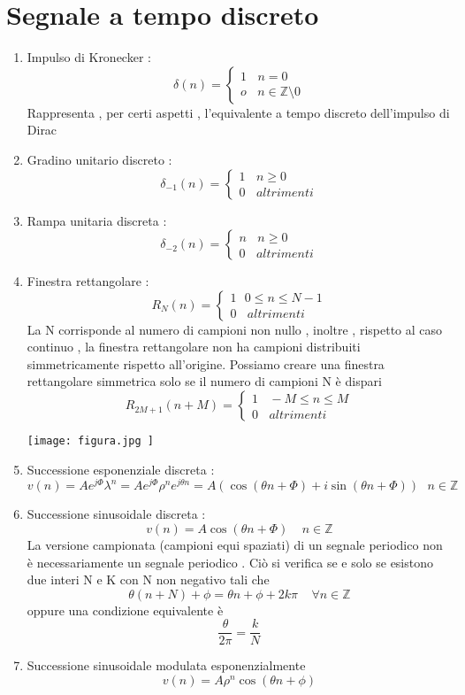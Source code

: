 \documentclass{article}
\theoremstyle{definition}
\newcommand{\la}{\lambda}
\begin{document}
\section{Segnale a tempo discreto}
\begin{enumerate}
	\item Impulso di Kronecker : \\
	$$\delta(n)=\begin{cases}
		1 \ \ \ \  n=0 \\
		o \ \ \ \  n \in \mathbb{Z}\setminus 0
	\end{cases}$$ 
	 Rappresenta , per certi aspetti , l'equivalente a tempo discreto dell'impulso di Dirac 
	\item Gradino unitario discreto :\\
	$$\delta_{-1}(n)=\begin{cases}
		1 \ \ \ \ n \geq 0 \\
		0 \ \ \ \ altrimenti
	\end{cases}$$
	\item Rampa unitaria discreta : 
	$$\delta_{-2}(n)=\begin{cases}
		n \ \ \ \ n \geq 0 \\
		0 \ \ \ \ altrimenti
	\end{cases}$$
	\item Finestra rettangolare : \\
	$$R_N(n)=\begin{cases}
		1 \ \ \ 0 \leq n \leq N-1\\
		0 \ \ \ \ altrimenti
	\end{cases}$$
	La N corrisponde al numero di campioni non nullo , inoltre , rispetto al caso continuo , la finestra rettangolare non ha campioni distribuiti simmetricamente rispetto all'origine. Possiamo creare una finestra rettangolare simmetrica solo se il numero di campioni N è dispari 
	$$R_{2M+1}(n+M)=\begin{cases}
	 1 \ \ \ \ -M \leq n \leq M \\
	 0 \ \ \ \ altrimenti 
	\end{cases}$$
	\begin{center}
		\texttt{[image: figura.jpg	]}
	\end{center}
	\item Successione esponenziale discreta : \\
	$$v(n)=Ae^{j\Phi}\la^n=A e^{j\Phi}\rho^n e^{j\theta n}=A(\cos(\theta n + \Phi)+i\sin(\theta n + \Phi)) \ \ \ n \in \mathbb{Z}$$
	\item Successione sinusoidale discreta : \\
	$$v(n)=A\cos(\theta n+\Phi) \ \ \ \ \ n \in \mathbb{Z}$$
	La versione campionata (campioni equi spaziati) di un segnale periodico non è necessariamente un segnale periodico . Ciò si verifica se e solo se esistono due interi N e K con N non negativo tali che 
	$$\theta(n+N)+\phi=\theta n + \phi + 2 k\pi  \ \ \ \ \ \forall n \in \mathbb{Z}$$ oppure una condizione equivalente è $$\frac{\theta}{2\pi}=\frac{k}{N}$$
	\item Successione sinusoidale modulata esponenzialmente \\ 
	$$v(n)=A\rho^n \cos(\theta n+\phi)$$
\end{enumerate}
\end{document}

